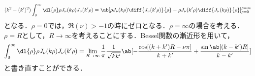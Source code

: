 \begin{enumerate}[%
  label=%
  \fbox{%
   {\thesection.\arabic*}%
    },%
    leftmargin=3\parindent]
\begin{enumerate}[(a)]
        \begin{gather}
          (k^2 - (k')^2) \int_0^\infty \dl{\rho} \rho J_\nu(k\rho)J_\nu(k'\rho) 
          = \ab[\rho J_\nu(k\rho)\diff{J_\nu(k'\rho)}{\rho} - \rho J_\nu(k'\rho)\diff{J_\nu(k\rho)}{\rho}]_{\rho=0}^{\rho=\infty}
        \end{gather}
        となる．$\rho = 0$では，$\Re (\nu) > -1$の時にゼロとなる．$\rho = \infty$の場合を考える．$\rho = R$として，$R \to \infty$を考えることにする．Bessel関数の漸近形を用いて，
        \begin{gather}  
          \int_0^\infty \dl{\rho}\rho J_\nu(k\rho) J_\nu(k' \rho) 
          = \lim_{R\to \infty}\frac{1}{\pi}\frac{1}{\sqrt{kk'}} \ab[-\frac{\cos[(k+k')R - \nu \pi]}{k+k'} + \frac{\sin\ab[(k-k')R]}{k-k'}]
        \end{gather}
        と書き直すことができる．


\end{enumerate}
\end{enumerate}
